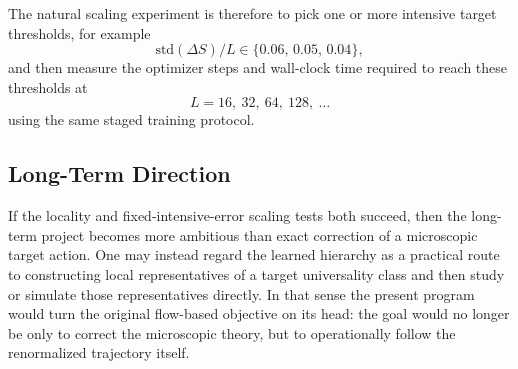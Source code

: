 \documentclass[aps,prd,reprint,nofootinbib,superscriptaddress,longbibliography]{revtex4-2}
\newcommand{\std}{\mathrm{std}}
\begin{document}
The natural scaling experiment is therefore to pick one or more intensive target
thresholds, for example
\begin{equation}
\std(\Delta S)/L \in \{0.06,\,0.05,\,0.04\},
\end{equation}
and then measure the optimizer steps and wall-clock time required to reach these
thresholds at
\begin{equation}
L=16,\ 32,\ 64,\ 128,\ \ldots
\end{equation}
using the same staged training protocol.

\subsection{Long-Term Direction}

If the locality and fixed-intensive-error scaling tests both succeed, then the
long-term project becomes more ambitious than exact correction of a microscopic
target action. One may instead regard the learned hierarchy as a practical route
to constructing local representatives of a target universality class and then
study or simulate those representatives directly. In that sense the present
program would turn the original flow-based objective on its head: the goal would
no longer be only to correct the microscopic theory, but to operationally follow
the renormalized trajectory itself.



\end{document}
